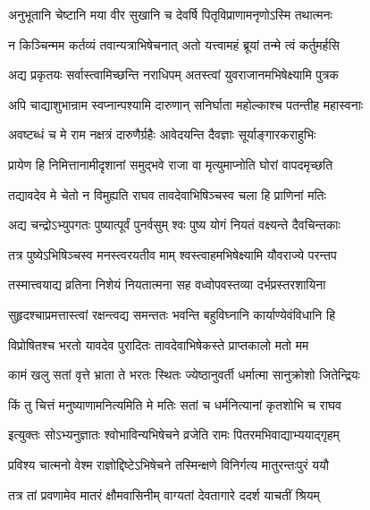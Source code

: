 \twolineshloka
{अनुभूतानि चेष्टानि मया वीर सुखानि च}
{देवर्षि पितृविप्राणामनृणोऽस्मि तथात्मनः} %

\twolineshloka
{न किञ्चिन्मम कर्तव्यं तवान्यत्राभिषेचनात्}
{अतो यत्त्वामहं ब्रूयां तन्मे त्वं कर्तुमर्हसि} %

\twolineshloka
{अद्य प्रकृतयः सर्वास्त्वामिच्छन्ति नराधिपम्}
{अतस्त्वां युवराजानमभिषेक्ष्यामि पुत्रक} %

\twolineshloka
{अपि चाद्याशुभान्राम स्वप्नान्पश्यामि दारुणान्}
{सनिर्घाता महोल्काश्च पतन्तीह महास्वनाः} %

\twolineshloka
{अवष्टब्धं च मे राम नक्षत्रं दारुणैर्ग्रहैः}
{आवेदयन्ति दैवज्ञाः सूर्याङ्गारकराहुभिः} %

\twolineshloka
{प्रायेण हि निमित्तानामीदृशानां समुद्भवे}
{राजा वा मृत्युमाप्नोति घोरां वापदमृच्छति} %

\twolineshloka
{तद्यावदेव मे चेतो न विमुह्यति राघव}
{तावदेवाभिषिञ्चस्व चला हि प्राणिनां मतिः} %

\twolineshloka
{अद्य चन्द्रोऽभ्युपगतः पुष्यात्पूर्वं पुनर्वसुम्}
{श्वः पुष्य योगं नियतं वक्ष्यन्ते दैवचिन्तकाः} %

\twolineshloka
{तत्र पुष्येऽभिषिञ्चस्व मनस्त्वरयतीव माम्}
{श्वस्त्वाहमभिषेक्ष्यामि यौवराज्ये परन्तप} %

\twolineshloka
{तस्मात्त्वयाद्य व्रतिना निशेयं नियतात्मना}
{सह वध्वोपवस्तव्या दर्भप्रस्तरशायिना} %

\twolineshloka
{सुहृदश्चाप्रमत्तास्त्वां रक्षन्त्वद्य समन्ततः}
{भवन्ति बहुविघ्नानि कार्याण्येवंविधानि हि} %

\twolineshloka
{विप्रोषितश्च भरतो यावदेव पुरादितः}
{तावदेवाभिषेकस्ते प्राप्तकालो मतो मम} %

\twolineshloka
{कामं खलु सतां वृत्ते भ्राता ते भरतः स्थितः}
{ज्येष्ठानुवर्ती धर्मात्मा सानुक्रोशो जितेन्द्रियः} %

\twolineshloka
{किं तु चित्तं मनुष्याणामनित्यमिति मे मतिः}
{सतां च धर्मनित्यानां कृतशोभि च राघव} %

\twolineshloka
{इत्युक्तः सोऽभ्यनुज्ञातः श्वोभाविन्यभिषेचने}
{व्रजेति रामः पितरमभिवाद्याभ्ययाद्गृहम्} %

\twolineshloka
{प्रविश्य चात्मनो वेश्म राज्ञोद्दिष्टेऽभिषेचने}
{तस्मिन्क्षणे विनिर्गत्य मातुरन्तःपुरं ययौ} %

\twolineshloka
{तत्र तां प्रवणामेव मातरं क्षौमवासिनीम्}
{वाग्यतां देवतागारे ददर्श याचतीं श्रियम्} %


